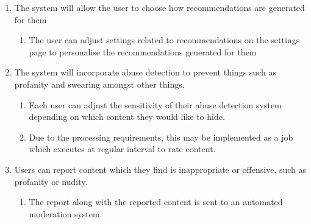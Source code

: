 \begin{enumerate}[label=\textbf{F\arabic*}]
	\item The system will allow the user to choose how recommendations are generated for them
	\begin{enumerate}
		\item The user can adjust settings related to recommendations on the settings page to personalise the recommendations generated for them
	\end{enumerate}
	\item The system will incorporate abuse detection to prevent things such as profanity and swearing amongst other things.
		\begin{enumerate}
			\item Each user can adjust the sensitivity of their abuse detection system depending on which content they would like to hide.
			\item Due to the processing requirements, this may be implemented as a job which executes at regular interval to rate content.
		\end{enumerate}
	\item Users can report content which they find is inappropriate or offensive, such as profanity or nudity.
		\begin{enumerate}
			\item The report along with the reported content is sent to an automated moderation system.
		\end{enumerate}
\end{enumerate}

